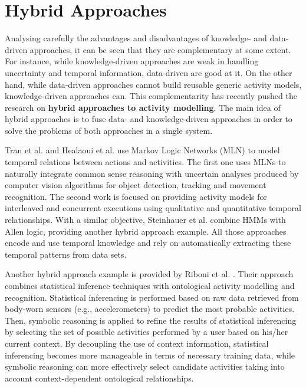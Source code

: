\section{Hybrid Approaches}
\label{sec:soa:hybrid}


Analysing carefully the advantages and disadvantages of knowledge- and data-driven approaches, it can be seen that they are complementary at some extent. For instance, while knowledge-driven approaches are weak in handling uncertainty and temporal information, data-driven are good at it. On the other hand, while data-driven approaches cannot build reusable generic activity models, knowledge-driven approaches can. This complementarity has recently pushed the research on \textbf{hybrid approaches to activity modelling}. The main idea of hybrid approaches is to fuse data- and knowledge-driven approaches in order to solve the problems of both approaches in a single system.

Tran et al. \cite{Tran2008} and Healaoui et al. \cite{Helaoui2011a} use Markov Logic Networks (MLN) to model temporal relations between actions and activities. The first one uses MLNs to naturally integrate common sense reasoning with uncertain analyses produced by computer vision algorithms for object detection, tracking and movement recognition. The second work is focused on providing activity models for interleaved and concurrent executions using qualitative and quantitative temporal relationships. With a similar objective, Steinhauer et al. \cite{Steinhauer2010} combine HMMs with Allen logic, providing another hybrid approach example. All those approaches encode and use temporal knowledge and rely on automatically extracting these temporal patterns from data sets.

Another hybrid approach example is provided by Riboni et al. \cite{Riboni2011a}. Their approach combines statistical inference techniques with ontological activity modelling and recognition. Statistical inferencing is performed based on raw data retrieved from body-worn sensors (e.g., accelerometers) to predict the most probable activities. Then, symbolic reasoning is applied to refine the results of statistical inferencing by selecting the set of possible activities performed by a user based on his/her current context. By decoupling the use of context information, statistical inferencing becomes more manageable in terms of necessary training data, while symbolic reasoning can more effectively select candidate activities taking into account context-dependent ontological relationships.

